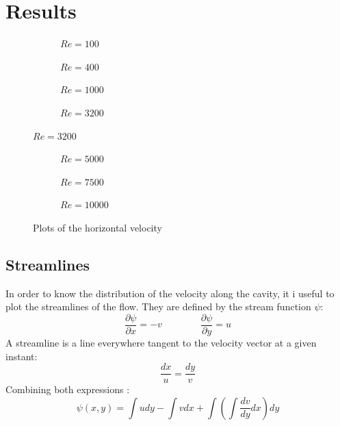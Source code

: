 \section{Results}
\begin{figure}[h]
	\centering
	\begin{subfigure}{0.5\textwidth}
		\resizebox{1.4\textwidth}{!}{}
		\caption{$Re=100$}
	\end{subfigure}%
	\begin{subfigure}{0.5\textwidth}
		\resizebox{1.4\textwidth}{!}{}
		\caption{$Re=400$}
	\end{subfigure}
	\begin{subfigure}{0.5\textwidth}
		\resizebox{1.4\textwidth}{!}{}
		\caption{$Re=1000$}
	\end{subfigure}%
	\begin{subfigure}{0.5\textwidth}
		\resizebox{1.4\textwidth}{!}{}
		\caption{$Re=3200$}
	\end{subfigure}
\end{figure}
\begin{figure}\ContinuedFloat
	\begin{subfigure}{0.5\textwidth}
		\resizebox{1.4\textwidth}{!}{}
		\caption{$Re=5000$}
	\end{subfigure}%
	\begin{subfigure}{0.5\textwidth}
		\resizebox{1.4\textwidth}{!}{}
		\caption{$Re=7500$}
	\end{subfigure}
	\begin{subfigure}{0.5\textwidth}
		\center
		\resizebox{1.4\textwidth}{!}{}
		\caption{$Re=10000$}
	\end{subfigure}
	\caption{Plots of the horizontal velocity}
\end{figure}

\subsection{Streamlines}
In order to know the distribution of the velocity along the cavity, it i useful to plot the streamlines of the flow. They are defined by the stream function $\psi$:
\begin{equation}
\frac{\partial\psi}{\partial x}=-v
\qquad\qquad
\frac{\partial\psi}{\partial y}=u
\end{equation}
A streamline is a line everywhere tangent to the velocity vector at a given instant:
\begin{equation}
\frac{dx}{u}=\frac{dy}{v}
\end{equation}
Combining both expressions \cite{Haegland2007}:
\begin{equation}
\psi\left(x, y\right)=\int udy-\int vdx+\int\left(\int\frac{dv}{dy}dx\right)dy
\end{equation}